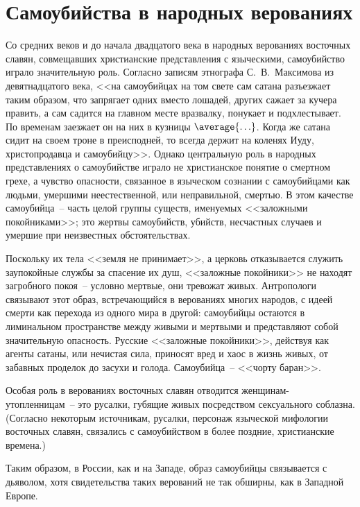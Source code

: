 \documentclass[pscyr,chapters]{hedwork}
\begin{document}
  \section{Самоубийства в народных верованиях}
  
  Со средних веков и до начала
  двадцатого века в народных верованиях восточных славян, совмещавших
  христианские представления с языческими, самоубийство играло значительную
  роль. Согласно записям этнографа С.~В.~Максимова из девятнадцатого века, <<на
  самоубийцах на том свете сам сатана разъезжает таким образом, что запрягает
  одних вместо лошадей, других сажает за кучера править, а сам садится на
  главном месте вразвалку, понукает и подхлестывает. По временам заезжает он на
  них в кузницы \( \average{\ldots} \). Когда же сатана сидит на своем троне в
  преисподней, то всегда держит на коленях Иуду, христопродавца и самоубийцу>>.
  Однако центральную роль в народных представлениях о самоубийстве играло не
  христианское понятие о смертном грехе, а чувство опасности, связанное в
  языческом сознании с самоубийцами как людьми, умершими неестественной, или
  неправильной, смертью. В этом качестве самоубийца~-- часть целой группы
  существ, именуемых <<заложными покойниками>>; это жертвы самоубийств, убийств,
  несчастных случаев и умершие при неизвестных обстоятельствах.

  Поскольку их тела <<земля не принимает>>, а церковь отказывается служить
  заупокойные службы за спасение их душ, <<заложные покойники>> не находят
  загробного покоя~-- условно мертвые, они тревожат живых. Антропологи связывают
  этот образ, встречающийся в верованиях многих народов, с идеей смерти как
  перехода из одного мира в другой: самоубийцы остаются в лиминальном
  пространстве между живыми и мертвыми и представляют собой значительную
  опасность. Русские <<заложные покойники>>, действуя как агенты сатаны, или
  нечистая сила, приносят вред и хаос в жизнь живых, от забавных проделок до
  засухи и голода. Самоубийца~-- <<чорту баран>>.

  Особая роль в верованиях восточных славян отводится женщинам-утоп\-ленницам~--
  это русалки, губящие живых посредством сексуального соблазна. (Согласно
  некоторым источникам, русалки, персонаж языческой мифологии восточных славян,
  связались с самоубийством в более поздние, христианские времена.)

  Таким образом, в России, как и на Западе, образ самоубийцы связывается с
  дьяволом, хотя свидетельства таких верований не так обширны, как в Западной
  Европе.
\end{document}
